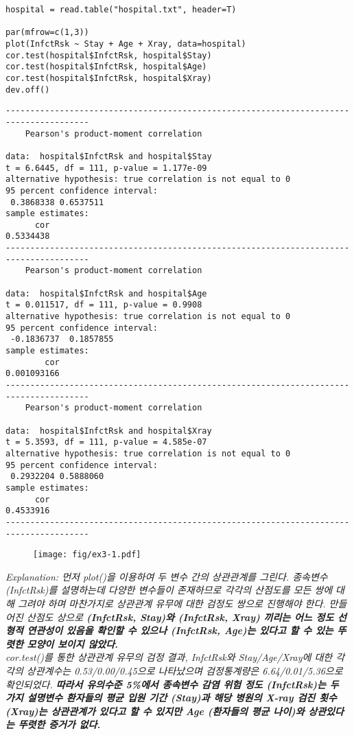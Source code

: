 \documentclass{article}
\begin{document}
\begin{lstlisting}[style={r-style}]
hospital = read.table("hospital.txt", header=T)

par(mfrow=c(1,3))
plot(InfctRsk ~ Stay + Age + Xray, data=hospital)
cor.test(hospital$InfctRsk, hospital$Stay)
cor.test(hospital$InfctRsk, hospital$Age)
cor.test(hospital$InfctRsk, hospital$Xray)
dev.off()
\end{lstlisting}
\begin{lstlisting}[style={out-style}]
---------------------------------------------------------------------------------------
	Pearson's product-moment correlation

data:  hospital$InfctRsk and hospital$Stay
t = 6.6445, df = 111, p-value = 1.177e-09
alternative hypothesis: true correlation is not equal to 0
95 percent confidence interval:
 0.3868338 0.6537511
sample estimates:
      cor 
0.5334438 
---------------------------------------------------------------------------------------
	Pearson's product-moment correlation

data:  hospital$InfctRsk and hospital$Age
t = 0.011517, df = 111, p-value = 0.9908
alternative hypothesis: true correlation is not equal to 0
95 percent confidence interval:
 -0.1836737  0.1857855
sample estimates:
        cor 
0.001093166 
---------------------------------------------------------------------------------------
	Pearson's product-moment correlation

data:  hospital$InfctRsk and hospital$Xray
t = 5.3593, df = 111, p-value = 4.585e-07
alternative hypothesis: true correlation is not equal to 0
95 percent confidence interval:
 0.2932204 0.5888060
sample estimates:
      cor 
0.4533916
---------------------------------------------------------------------------------------
\end{lstlisting}
\begin{figure}[htb!]
    \centering
    \texttt{[image: fig/ex3-1.pdf]}
\end{figure}
\emph{Explanation: 먼저 plot()을 이용하여 두 변수 간의 상관관계를 그린다. 종속변수 (InfctRsk)를 설명하는데 다양한 변수들이 존재하므로 각각의 산점도를 모든 쌍에 대해 그려야 하며 마찬가지로 상관관계 유무에 대한 검정도 쌍으로 진행해야 한다. 만들어진 산점도 상으로 \textbf{(InfctRsk, Stay)와 (InfctRsk, Xray) 끼리는 어느 정도 선형적 연관성이 있음을 확인할 수 있으나 (InfctRsk, Age)는 있다고 할 수 있는 뚜렷한 모양이 보이지 않았다.} \\ cor.test()를 통한 상관관계 유무의 검정 결과, InfctRsk와 Stay/Age/Xray에 대한 각각의 상관계수는 0.53/0.00/0.45으로 나타났으며 검정통계량은 6.64/0.01/5.36으로 확인되었다. \textbf{따라서 유의수준 5\%에서 종속변수 감염 위험 정도 (InfctRsk)는 두 가지 설명변수 환자들의 평균 입원 기간 (Stay)과 해당 병원의 X-ray 검진 횟수 (Xray)는 상관관계가 있다고 할 수 있지만 Age (환자들의 평균 나이)와 상관있다는 뚜렷한 증거가 없다.}} \\
\end{document}
